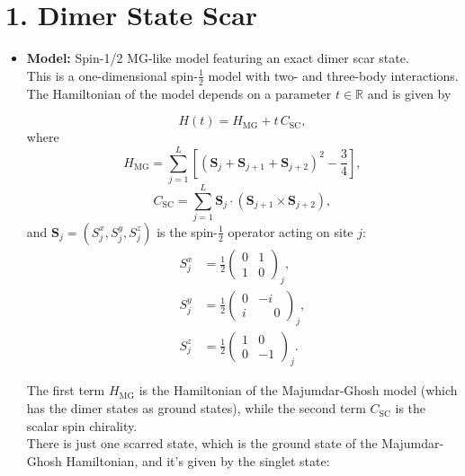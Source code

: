 \documentclass[11pt]{article}
\begin{document}
\section*{1. Dimer State Scar}
\begin{itemize}
    \item \textbf{Model:} Spin-1/2 MG-like model featuring an exact dimer scar state.\\
    This is a one-dimensional spin-$\tfrac{1}{2}$ model with two- and three-body interactions. The Hamiltonian of the model depends on a parameter $t \in \mathbb{R}$ and is given by
    
    \begin{equation}
    H(t) = H_{\mathrm{MG}} + t\, C_{\mathrm{SC}},
    \end{equation}
    where
	\begin{equation}
	H_{\mathrm{MG}} = \sum_{j=1}^{L} \left[ \left( \mathbf{S}_j + \mathbf{S}_{j+1} + \mathbf{S}_{j+2} \right)^2 - \frac{3}{4} \right],
	\label{eq:HMG}
	\end{equation}
	\begin{equation}
	C_{\mathrm{SC}} = \sum_{j=1}^{L} \mathbf{S}_j \cdot \left( \mathbf{S}_{j+1} \times \mathbf{S}_{j+2} \right),
	\label{eq:CSC}
	\end{equation}
	and $\mathbf{S}_j = \left(S^x_j, S^y_j, S^z_j\right)$ is the spin-$\tfrac{1}{2}$ operator acting on site $j$:  
	\begin{align}
	S^x_j &= \frac{1}{2}
	\begin{pmatrix}
	0 & 1 \\
	1 & 0
	\end{pmatrix}_j, \\
	S^y_j &= \frac{1}{2}
	\begin{pmatrix}
	0 & -i \\
	i & \phantom{-}0
	\end{pmatrix}_j, \\
	S^z_j &= \frac{1}{2}
	\begin{pmatrix}
	1 & 0 \\
	0 & -1
	\end{pmatrix}_j.
	\end{align}
	
	The first term $H_{\text{MG}}$ is the Hamiltonian of the Majumdar-Ghosh model (which has the dimer states as ground states), while the second term $C_{\text{SC}}$ is the scalar spin chirality.\\ 
	

    
     There is just one scarred state, which is the ground state of the Majumdar-Ghosh Hamiltonian, and it's given by the singlet state:
    

\end{itemize}
\end{document}
